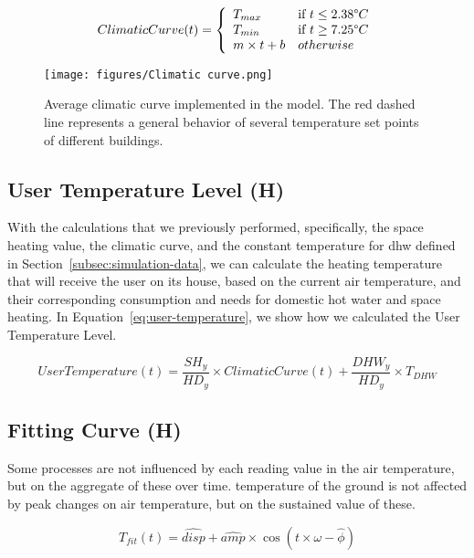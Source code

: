 \documentclass{article}
\begin{document}
\begin{equation}
\label{eq:climatic-curve}
    ClimaticCurve(t) = 
\left\{
	\begin{array}{lll}
		T_{max}  
		    & \mbox{if } t \leq 2.38 \degree C \\
		T_{min} 
		    & \mbox{if } t \geq 7.25 \degree C\\
		m \times t + b
		    & otherwise \\
	\end{array}
\right.
\end{equation}

\begin{figure}[H]
\centering
\texttt{[image: figures/Climatic curve.png]}
\caption{Average climatic curve implemented in the model. The red dashed line represents a general behavior of several temperature set points of different buildings.}
\label{fig:Climatic curve}
\end{figure}

\subsection{User Temperature Level (H)}
With the calculations that we previously performed, specifically, the space heating value, the climatic curve, and the constant temperature for \gls{dhw} defined in Section~\ref{subsec:simulation-data}, we can calculate the heating temperature that will receive the user on its house, based on the current air temperature, and their corresponding consumption and needs for domestic hot water and space heating. In Equation~\ref{eq:user-temperature}, we show how we calculated the User Temperature Level.

\begin{equation}
\label{eq:user-temperature}
    UserTemperature(t) = \frac{SH_y}{HD_y} \times ClimaticCurve(t) + \frac{DHW_y}{HD_y} \times T_{DHW}
\end{equation}

\subsection{Fitting Curve (H)}
Some processes are not influenced by each reading value in the air temperature, but on the aggregate of these over time. \eg temperature of the ground is not affected by peak changes on air temperature, but on the sustained value of these.

\begin{equation}
\label{equation:fit-curve}
    T_{fit}(t) = \widehat{disp} + \widehat{amp} \times \cos(t \times \omega - \widehat{\phi}) 
\end{equation}
\end{document}
